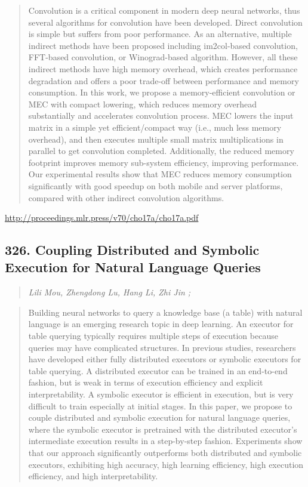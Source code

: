 \documentclass{article}
\begin{document}
\begin{quote}
    Convolution is a critical component in modern deep neural networks, thus several algorithms for convolution have been developed. Direct convolution is simple but suffers from poor performance. As an alternative, multiple indirect methods have been proposed including im2col-based convolution, FFT-based convolution, or Winograd-based algorithm. However, all these indirect methods have high memory overhead, which creates performance degradation and offers a poor trade-off between performance and memory consumption. In this work, we propose a memory-efficient convolution or MEC with compact lowering, which reduces memory overhead substantially and accelerates convolution process. MEC lowers the input matrix in a simple yet efficient/compact way (i.e., much less memory overhead), and then executes multiple small matrix multiplications in parallel to get convolution completed. Additionally, the reduced memory footprint improves memory sub-system efficiency, improving performance. Our experimental results show that MEC reduces memory consumption significantly with good speedup on both mobile and server platforms, compared with other indirect convolution algorithms.  \end{quote}

\href{http://proceedings.mlr.press/v70/cho17a/cho17a.pdf}{http://proceedings.mlr.press/v70/cho17a/cho17a.pdf}

\subsection{326. Coupling Distributed and Symbolic Execution for Natural Language Queries}

\begin{quote}
\footnotesize{\textit{Lili Mou, Zhengdong Lu, Hang Li, Zhi Jin ;}}
\end{quote}

\begin{quote}
    Building neural networks to query a knowledge base (a table) with natural language is an emerging research topic in deep learning. An executor for table querying typically requires multiple steps of execution because queries may have complicated structures. In previous studies, researchers have developed either fully distributed executors or symbolic executors for table querying. A distributed executor can be trained in an end-to-end fashion, but is weak in terms of execution efficiency and explicit interpretability. A symbolic executor is efficient in execution, but is very difficult to train especially at initial stages. In this paper, we propose to couple distributed and symbolic execution for natural language queries, where the symbolic executor is pretrained with the distributed executor’s intermediate execution results in a step-by-step fashion. Experiments show that our approach significantly outperforms both distributed and symbolic executors, exhibiting high accuracy, high learning efficiency, high execution efficiency, and high interpretability.  \end{quote}
\end{document}
